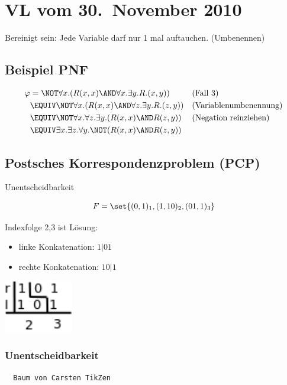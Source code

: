 \section{VL vom 30.~November 2010}
Bereinigt sein: Jede Variable darf nur 1 mal auftauchen. (Umbenennen)
\subsection{Beispiel PNF}

\begin{align}
  \varphi &= \NOT\forall x.(R(x,x) \AND \forall x.\exists y.R.(x,y)) && \text{(Fall 3)} \\
    &\EQUIV \NOT\forall x.(R(x,x) \AND \forall z.\exists y.R.(z,y)) && \text{(Variablenumbenennung)} \\
    &\EQUIV \NOT\forall x.\forall z.\exists y.(R(x,x) \AND R(z,y)) && \text{(Negation reinziehen)} \\
    &\EQUIV \exists x.\exists z.\forall y. \NOT(R(x,x) \AND R(z,y))
\end{align}

\subsection{Postsches Korrespondenzproblem (PCP)}
Unentscheidbarkeit\\

\[
  F = \set{(0,1)_1, (1,10)_2, (01,1)_3}
\]

Indexfolge 2,3 ist Lösung:

\begin{itemize}
  \item linke Konkatenation:  $1|0 1$
  \item rechte Konkatenation: $1 0|1$
\end{itemize}

\includegraphics[width=3cm]{30_11_10_1.png}

\subsubsection{Unentscheidbarkeit}

\begin{verbatim}
  Baum von Carsten TikZen
\end{verbatim}

